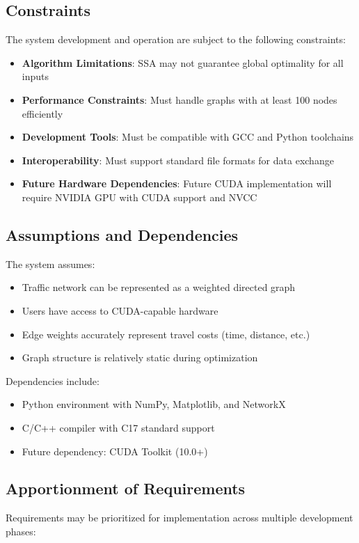 \documentclass[conference]{IEEEtran}
\begin{document}
\subsection{Constraints}
The system development and operation are subject to the following constraints:

\begin{itemize}
    \item \textbf{Algorithm Limitations}: SSA may not guarantee global optimality for all inputs
    \item \textbf{Performance Constraints}: Must handle graphs with at least 100 nodes efficiently
    \item \textbf{Development Tools}: Must be compatible with GCC and Python toolchains
    \item \textbf{Interoperability}: Must support standard file formats for data exchange
    \item \textbf{Future Hardware Dependencies}: Future CUDA implementation will require NVIDIA GPU with CUDA support and NVCC
\end{itemize}

\subsection{Assumptions and Dependencies}
The system assumes:

\begin{itemize}
    \item Traffic network can be represented as a weighted directed graph
    \item Users have access to CUDA-capable hardware
    \item Edge weights accurately represent travel costs (time, distance, etc.)
    \item Graph structure is relatively static during optimization
\end{itemize}

Dependencies include:
\begin{itemize}
    \item Python environment with NumPy, Matplotlib, and NetworkX
    \item C/C++ compiler with C17 standard support
    \item Future dependency: CUDA Toolkit (10.0+)
\end{itemize}

\subsection{Apportionment of Requirements}
Requirements may be prioritized for implementation across multiple development phases:
\end{document}
